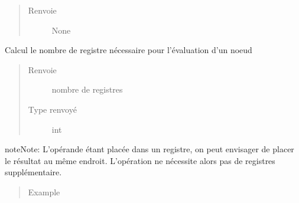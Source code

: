 \documentclass[letterpaper,10pt,french]{sphinxmanual}
\begin{document}
\begin{fulllineitems}
\begin{fulllineitems}
\begin{quote}
\begin{description}
\item[{Renvoie}] \leavevmode
None

\end{description}\end{quote}

\end{fulllineitems}


\begin{fulllineitems}
\label{\detokenize{arithmeticexpressionnodes:arithmeticexpressionnodes.NegNode.getRegisterCost}}
Calcul le nombre de registre nécessaire pour l’évaluation d’un noeud
\begin{quote}\begin{description}
\item[{Renvoie}] \leavevmode
nombre de registres

\item[{Type renvoyé}] \leavevmode
int

\end{description}\end{quote}

\begin{sphinxadmonition}{note}{Note:}
L’opérande étant placée dans un registre, on peut envisager de placer le résultat au même endroit.
L’opération ne nécessite alors pas de registres supplémentaire.
\end{sphinxadmonition}
\begin{quote}\begin{description}
\item[{Example}] \leavevmode
\begin{sphinxVerbatim}[commandchars=\\\{\}]
  
  
  
    
  
\end{sphinxVerbatim}


\end{description}
\end{quote}
\end{fulllineitems}
\end{fulllineitems}
\end{document}
